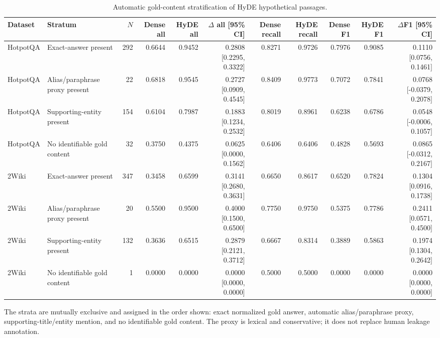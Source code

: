 \begin{table}[t]
\centering
\caption{Automatic gold-content stratification of HyDE hypothetical passages.}
\label{tab:hyde_gold_content_groups}
\scriptsize
\begin{threeparttable}
\setlength{\tabcolsep}{1.8pt}
\begin{tabularx}{\textwidth}{>{\raggedright\arraybackslash}p{} >{\raggedright\arraybackslash}X r r r r r r r r r}
\toprule
Dataset & Stratum & $N$ & Dense all & HyDE all & $\Delta$ all [95\% CI] & Dense recall & HyDE recall & Dense F1 & HyDE F1 & $\Delta$F1 [95\% CI] \\
\midrule
HotpotQA & Exact-answer present & 292 & 0.6644 & 0.9452 & 0.2808 [0.2295, 0.3322] & 0.8271 & 0.9726 & 0.7976 & 0.9085 & 0.1110 [0.0756, 0.1461] \\
HotpotQA & Alias/paraphrase proxy present & 22 & 0.6818 & 0.9545 & 0.2727 [0.0909, 0.4545] & 0.8409 & 0.9773 & 0.7072 & 0.7841 & 0.0768 [-0.0379, 0.2078] \\
HotpotQA & Supporting-entity present & 154 & 0.6104 & 0.7987 & 0.1883 [0.1234, 0.2532] & 0.8019 & 0.8961 & 0.6238 & 0.6786 & 0.0548 [-0.0006, 0.1057] \\
HotpotQA & No identifiable gold content & 32 & 0.3750 & 0.4375 & 0.0625 [0.0000, 0.1562] & 0.6406 & 0.6406 & 0.4828 & 0.5693 & 0.0865 [-0.0312, 0.2167] \\
2Wiki & Exact-answer present & 347 & 0.3458 & 0.6599 & 0.3141 [0.2680, 0.3631] & 0.6650 & 0.8617 & 0.6520 & 0.7824 & 0.1304 [0.0916, 0.1738] \\
2Wiki & Alias/paraphrase proxy present & 20 & 0.5500 & 0.9500 & 0.4000 [0.1500, 0.6500] & 0.7750 & 0.9750 & 0.5375 & 0.7786 & 0.2411 [0.0571, 0.4500] \\
2Wiki & Supporting-entity present & 132 & 0.3636 & 0.6515 & 0.2879 [0.2121, 0.3712] & 0.6667 & 0.8314 & 0.3889 & 0.5863 & 0.1974 [0.1304, 0.2642] \\
2Wiki & No identifiable gold content & 1 & 0.0000 & 0.0000 & 0.0000 [0.0000, 0.0000] & 0.5000 & 0.5000 & 0.0000 & 0.0000 & 0.0000 [0.0000, 0.0000] \\
\bottomrule
\end{tabularx}
\begin{tablenotes}
\footnotesize
\item The strata are mutually exclusive and assigned in the order shown: exact normalized gold answer, automatic alias/paraphrase proxy, supporting-title/entity mention, and no identifiable gold content. The proxy is lexical and conservative; it does not replace human leakage annotation.
\end{tablenotes}
\end{threeparttable}
\end{table}

